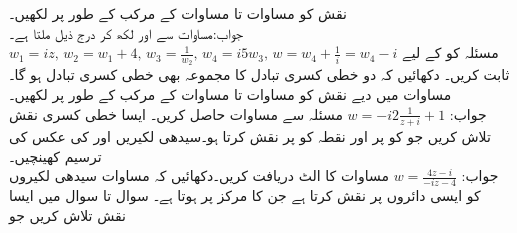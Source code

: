 \quad
نقش  کو مساوات  تا مساوات  کے مرکب کے طور پر لکھیں۔\\
جواب:\quad مساوات  سے  اور   لکھ کر درج ذیل ملتا ہے۔\\
 $w_1=iz,\, w_2=w_1+4,\, w_3=\tfrac{1}{w_2},\, w_4=i5w_3,\,w=w_4+\tfrac{1}{i}=w_4-i$
\quad
مسئلہ  کو  کے لیے ثابت کریں۔
\quad
دکھائیں کہ دو خطی کسری تبادل کا مجموعہ بھی خطی کسری تبادل ہو گا۔
\quad
مساوات  میں دیے نقش کو مساوات  تا مساوات  کے مرکب کے طور پر لکھیں۔\\
جواب:\quad
$w=-i2\tfrac{1}{z+i}+1$
\quad
مسئلہ  سے مساوات  حاصل کریں۔
\quad
ایسا خطی کسری نقش تلاش کریں جو  کو  پر اور نقطہ  کو  پر نقش کرتا ہو۔سیدھی لکیریں  اور  کی عکس کی ترسیم کھینچیں۔\\
جواب:\quad
$w=\tfrac{4z-i}{-iz-4}$
\quad
مساوات  کا الٹ دریافت کریں۔دکھائیں کہ مساوات  سیدھی  لکیروں کو ایسی دائروں پر نقش کرتا ہے جن کا مرکز  پر ہوتا ہے۔ 
سوال  تا سوال  میں ایسا نقش تلاش کریں جو

